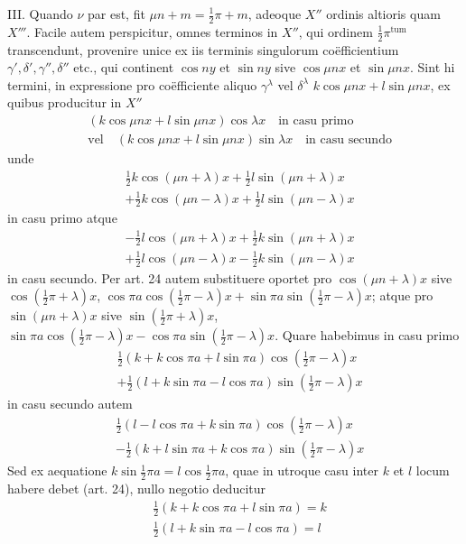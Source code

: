 III. Quando $\nu$ par est, fit $\mu n+m=\tfrac12\pi+m$, adeoque $X''$ ordinis altioris
quam $X'''$. Facile autem perspicitur, omnes terminos in $X''$, qui ordinem
$\tfrac12\pi^{\mathrm{tum}}$ transcendunt, provenire unice ex iis terminis singulorum
coëfficientium $\gamma',\delta',\gamma'',\delta''$ etc., qui continent $\cos ny$ et
$\sin ny$ sive $\cos\mu nx$ et $\sin\mu nx$. Sint hi termini, in expressione pro
coëfficiente aliquo $\gamma^\lambda$ vel $\delta^\lambda$ $k\cos\mu nx+l\sin\mu nx$,
ex quibus producitur in $X''$
\[
\begin{aligned}
&(k\cos\mu nx+l\sin\mu nx)\cos\lambda x\quad\text{in casu primo}\\[5pt]
&\text{vel}\quad(k\cos\mu nx+l\sin\mu nx)\sin\lambda x\quad\text{in casu secundo}
\end{aligned}
\]
unde
\[
\begin{aligned}
&\tfrac12k\cos(\mu n+\lambda)x+\tfrac12l\sin(\mu n+\lambda)x\\[5pt]
&+\tfrac12k\cos(\mu n-\lambda)x+\tfrac12l\sin(\mu n-\lambda)x
\end{aligned}
\]
in casu primo atque
\[
\begin{aligned}
&-\tfrac12l\cos(\mu n+\lambda)x+\tfrac12k\sin(\mu n+\lambda)x\\[5pt]
&+\tfrac12l\cos(\mu n-\lambda)x-\tfrac12k\sin(\mu n-\lambda)x
\end{aligned}
\]
in casu secundo. Per art. 24 autem substituere oportet pro $\cos(\mu n+\lambda)x$
sive $\cos(\tfrac12\pi+\lambda)x$, $\cos\pi a\cos(\tfrac12\pi-\lambda)x+\sin\pi a\sin(\tfrac12\pi-\lambda)x$;
atque pro $\sin(\mu n+\lambda)x$ sive $\sin(\tfrac12\pi+\lambda)x$,
$\sin\pi a\cos(\tfrac12\pi-\lambda)x-\cos\pi a\sin(\tfrac12\pi-\lambda)x$.
Quare habebimus in casu primo
\[
\begin{aligned}
&\tfrac12(k+k\cos\pi a+l\sin\pi a)\cos(\tfrac12\pi-\lambda)x\\[5pt]
&+\tfrac12(l+k\sin\pi a-l\cos\pi a)\sin(\tfrac12\pi-\lambda)x
\end{aligned}
\]
in casu secundo autem
\[
\begin{aligned}
&\tfrac12(l-l\cos\pi a+k\sin\pi a)\cos(\tfrac12\pi-\lambda)x\\[5pt]
&-\tfrac12(k+l\sin\pi a+k\cos\pi a)\sin(\tfrac12\pi-\lambda)x
\end{aligned}
\]
Sed ex aequatione $k\sin\tfrac12\pi a=l\cos\tfrac12\pi a$, quae in utroque casu
inter $k$ et $l$ locum habere debet (art. 24), nullo negotio deducitur
\[
\begin{aligned}
&\tfrac12(k+k\cos\pi a+l\sin\pi a)=k\\[5pt]
&\tfrac12(l+k\sin\pi a-l\cos\pi a)=l
\end{aligned}
\]
